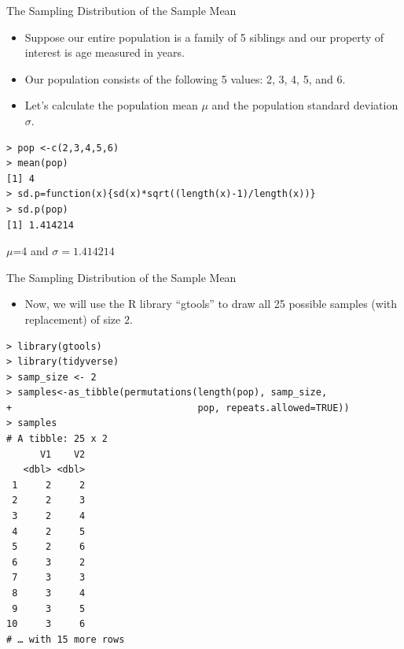 \documentclass[handout]{beamer}
\begin{document}
\begin{frame}[fragile]{The Sampling Distribution of the Sample Mean}
\scriptsize{
\begin{itemize}
\item Suppose our entire population is a family of 5 siblings and our property of interest is age measured in years.

\item Our population consists of the following 5 values: 2, 3, 4, 5, and 6. 
\item Let's calculate the population mean $\mu$ and the population standard deviation $\sigma$.
\end{itemize}

\begin{verbatim}
> pop <-c(2,3,4,5,6)
> mean(pop)
[1] 4
> sd.p=function(x){sd(x)*sqrt((length(x)-1)/length(x))}
> sd.p(pop)
[1] 1.414214 
\end{verbatim}

$\mu$=4 and $\sigma=1.414214$

} 
\end{frame}

\begin{frame}[fragile]{The Sampling Distribution of the Sample Mean}
\scriptsize{
\begin{itemize}
\item Now, we will use the R library ``gtools'' to draw all 25 possible samples (with replacement) of size $2$.
\end{itemize}

\begin{verbatim}
> library(gtools)
> library(tidyverse)
> samp_size <- 2
> samples<-as_tibble(permutations(length(pop), samp_size,
+                                 pop, repeats.allowed=TRUE))
> samples
# A tibble: 25 x 2
      V1    V2
   <dbl> <dbl>
 1     2     2
 2     2     3
 3     2     4
 4     2     5
 5     2     6
 6     3     2
 7     3     3
 8     3     4
 9     3     5
10     3     6
# … with 15 more rows
\end{verbatim}



} 
\end{frame}
\end{document}
